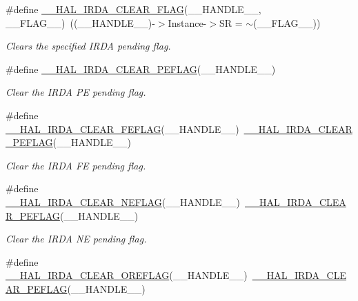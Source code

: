 \begin{DoxyCompactItemize}
\#define \hyperlink{group___i_r_d_a___exported___macros_ga4ebf474ecfd858f9320bef9bc67c0bce}{\+\_\+\+\_\+\+H\+A\+L\+\_\+\+I\+R\+D\+A\+\_\+\+C\+L\+E\+A\+R\+\_\+\+F\+L\+AG}(\+\_\+\+\_\+\+H\+A\+N\+D\+L\+E\+\_\+\+\_\+,  \+\_\+\+\_\+\+F\+L\+A\+G\+\_\+\+\_\+)~((\+\_\+\+\_\+\+H\+A\+N\+D\+L\+E\+\_\+\+\_\+)-\/$>$Instance-\/$>$SR = $\sim$(\+\_\+\+\_\+\+F\+L\+A\+G\+\_\+\+\_\+))
\begin{DoxyCompactList}\small\item\em Clears the specified I\+R\+DA pending flag. \end{DoxyCompactList}\item 
\#define \hyperlink{group___i_r_d_a___exported___macros_gae69bd04d655a956dba913c52638de303}{\+\_\+\+\_\+\+H\+A\+L\+\_\+\+I\+R\+D\+A\+\_\+\+C\+L\+E\+A\+R\+\_\+\+P\+E\+F\+L\+AG}(\+\_\+\+\_\+\+H\+A\+N\+D\+L\+E\+\_\+\+\_\+)
\begin{DoxyCompactList}\small\item\em Clear the I\+R\+DA PE pending flag. \end{DoxyCompactList}\item 
\#define \hyperlink{group___i_r_d_a___exported___macros_gaac85c179f4f6761f34acd00a4f8fdccb}{\+\_\+\+\_\+\+H\+A\+L\+\_\+\+I\+R\+D\+A\+\_\+\+C\+L\+E\+A\+R\+\_\+\+F\+E\+F\+L\+AG}(\+\_\+\+\_\+\+H\+A\+N\+D\+L\+E\+\_\+\+\_\+)~\hyperlink{group___i_r_d_a___exported___macros_gae69bd04d655a956dba913c52638de303}{\+\_\+\+\_\+\+H\+A\+L\+\_\+\+I\+R\+D\+A\+\_\+\+C\+L\+E\+A\+R\+\_\+\+P\+E\+F\+L\+AG}(\+\_\+\+\_\+\+H\+A\+N\+D\+L\+E\+\_\+\+\_\+)
\begin{DoxyCompactList}\small\item\em Clear the I\+R\+DA FE pending flag. \end{DoxyCompactList}\item 
\#define \hyperlink{group___i_r_d_a___exported___macros_gab93a0324a6fd84860dda19165e0dc9fd}{\+\_\+\+\_\+\+H\+A\+L\+\_\+\+I\+R\+D\+A\+\_\+\+C\+L\+E\+A\+R\+\_\+\+N\+E\+F\+L\+AG}(\+\_\+\+\_\+\+H\+A\+N\+D\+L\+E\+\_\+\+\_\+)~\hyperlink{group___i_r_d_a___exported___macros_gae69bd04d655a956dba913c52638de303}{\+\_\+\+\_\+\+H\+A\+L\+\_\+\+I\+R\+D\+A\+\_\+\+C\+L\+E\+A\+R\+\_\+\+P\+E\+F\+L\+AG}(\+\_\+\+\_\+\+H\+A\+N\+D\+L\+E\+\_\+\+\_\+)
\begin{DoxyCompactList}\small\item\em Clear the I\+R\+DA NE pending flag. \end{DoxyCompactList}\item 
\#define \hyperlink{group___i_r_d_a___exported___macros_ga43c79a3caa8de46f51b8f0b597e89377}{\+\_\+\+\_\+\+H\+A\+L\+\_\+\+I\+R\+D\+A\+\_\+\+C\+L\+E\+A\+R\+\_\+\+O\+R\+E\+F\+L\+AG}(\+\_\+\+\_\+\+H\+A\+N\+D\+L\+E\+\_\+\+\_\+)~\hyperlink{group___i_r_d_a___exported___macros_gae69bd04d655a956dba913c52638de303}{\+\_\+\+\_\+\+H\+A\+L\+\_\+\+I\+R\+D\+A\+\_\+\+C\+L\+E\+A\+R\+\_\+\+P\+E\+F\+L\+AG}(\+\_\+\+\_\+\+H\+A\+N\+D\+L\+E\+\_\+\+\_\+)

\end{DoxyCompactItemize}
